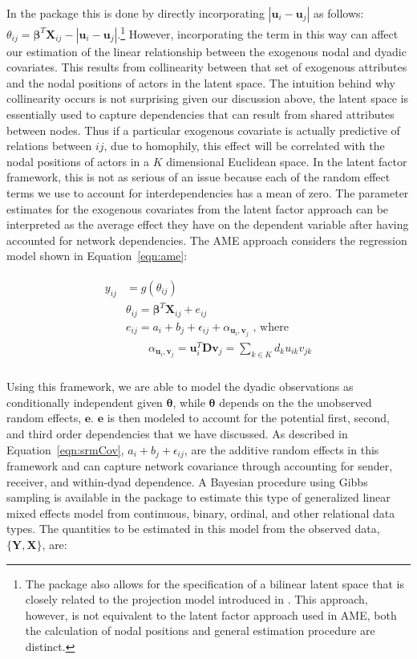 In the  package this is done by directly incorporating $|\bm u_{i} - \bm u_{j}|$ as follows: $\theta_{ij} = \bm\beta^{T} \mathbf{X}_{ij} - |\bm u_{i} - \bm u_{j}|$.\footnote{The  package also allows for the specification of a bilinear latent space that is closely related to the projection model introduced in \citet{hoff:etal:2002}. This approach, however, is not equivalent to the latent factor approach used in AME, both the calculation of nodal positions and general estimation procedure are distinct.} However, incorporating the term in this way can affect our estimation of the linear relationship between the exogenous nodal and dyadic covariates. This results from collinearity between that set of exogenous attributes and the nodal positions of actors in the latent space. The intuition behind why collinearity occurs is not surprising given our discussion above, the latent space is essentially used to capture dependencies that can result from shared attributes between nodes. Thus if a particular exogenous covariate is actually predictive of relations between $ij$, due to homophily, this effect will be correlated with the nodal positions of actors in a $K$ dimensional Euclidean space. In the latent factor framework, this is not as serious of an issue because each of the random effect terms we use to account for interdependencies has a mean of zero. The parameter estimates for the exogenous covariates from the latent factor approach can be interpreted as the average effect they have on the dependent variable after having accounted for network dependencies. The AME approach considers the regression model shown in Equation~\ref{eqn:ame}:

\begin{align}
\begin{aligned}
	y_{ij} &= g(\theta_{ij}) \\ 
	&\theta_{ij} = \bm\beta^{T} \mathbf{X}_{ij} + e_{ij} \\
	&e_{ij} = a_{i} + b_{j}  + \epsilon_{ij} + \alpha_{\bm u_{i}, \textbf{v}_{j}} \text{  , where } \\
	&\qquad \alpha_{\bm u_{i}, \textbf{v}_{j}} = \bm u_{i}^{T} \textbf{D} \textbf{v}_{j} = \sum_{k \in K} d_{k} u_{ik} v_{jk} \\ 
\label{eqn:ame}
\end{aligned}
\end{align}

Using this framework, we are able to model the dyadic observations as conditionally independent given $\bm\theta$, while $\bm\theta$ depends on the the unobserved random effects, $\mathbf{e}$. $\mathbf{e}$ is then modeled to account for the potential first, second, and third order dependencies that we have discussed. As described in Equation~\ref{eqn:srmCov}, $a_{i} + b_{j}  + \epsilon_{ij}$, are the additive random effects in this framework and can capture network covariance through accounting for sender, receiver, and within-dyad dependence. A Bayesian procedure using Gibbs sampling is available in the  package to estimate this type of generalized linear mixed effects model from continuous, binary, ordinal, and other relational data types. The quantities to be estimated in this model from the observed data, $\{\mathbf{Y}, \mathbf{X}\}$, are:

